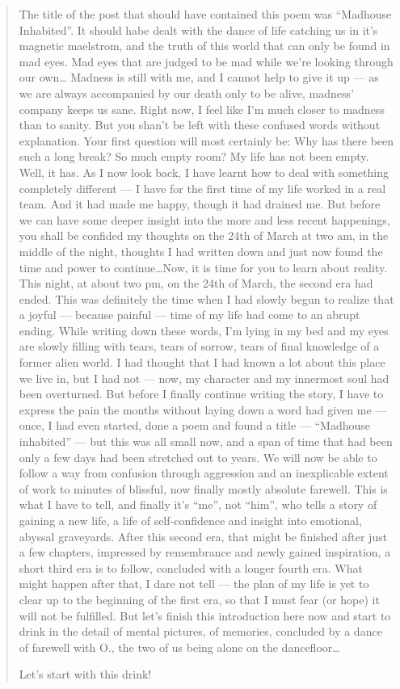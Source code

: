 \begin{quote}
The title of the post that should have contained this poem was \enquote{Madhouse Inhabited}. It should habe dealt with the dance of life catching us in it's magnetic maelstrom, and the truth of this world that can only be found in mad eyes. Mad eyes that are judged to be mad while we're looking through our own\ldots
Madness is still with me, and I cannot help to give it up --- as we are always accompanied by our death only to be alive, madness' company keeps us sane. Right now, I feel like I'm much closer to madness than to sanity. But you shan't be left with these confused words without explanation. 
Your first question will most certainly be: Why has there been such a long break? So much empty room? 
My life has not been empty. Well, it has. As I now look back, I have learnt how to deal with something completely different --- I have for the first time of my life worked in a real team. And it had made me happy, though it had drained me. But before we can have some deeper insight into the more and less recent happenings, you shall be confided my thoughts on the 24th of March at two am, in the middle of the night, thoughts I had written down and just now found the time and power to continue\ldots Now, it is time for you to learn about reality. 
This night, at about two pm, on the 24th of March, the second era had ended. This was definitely the time when I had slowly begun to realize that a joyful --- because painful --- time of my life had come to an abrupt ending. While writing down these words, I'm lying in my bed and my eyes are slowly filling with tears, tears of sorrow, tears of final knowledge of a former alien world. I had thought that I had known a lot about this place we live in, but I had not --- now, my character and my innermost soul had been overturned. But before I finally continue writing the story, I have to express the pain the months without laying down a word had given me --- once, I had even started, done a poem and found a title --- \enquote{Madhouse inhabited} --- but this was all small now, and a span of time that had been only a few days had been stretched out to years. We will now be able to follow a way from confusion through aggression and an inexplicable extent of work to minutes of blissful, now finally mostly absolute farewell. This is what I have to tell, and finally it's \enquote{me}, not \enquote{him}, who tells a story of gaining a new life, a life of self-confidence and insight into emotional, abyssal graveyards. After this second era, that might be finished after just a few chapters, impressed by remembrance and newly gained inspiration, a short third era is to follow, concluded with a longer fourth era. What might happen after that, I dare not tell --- the plan of my life is yet to clear up to the beginning of the first era, so that I must fear (or hope) it will not be fulfilled. But let's finish this introduction here now and start to drink in the detail of mental pictures, of memories, concluded by a dance of farewell with O., the two of us being alone on the dancefloor\ldots

Let's start with this drink!
\end{quote}

